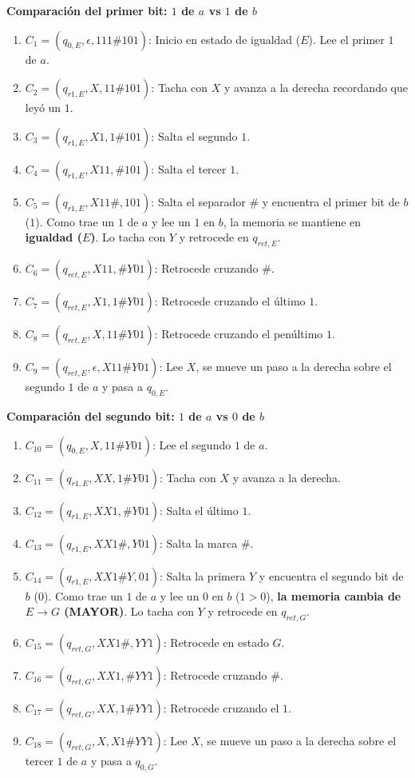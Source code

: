 \vspace{0.2cm}
\noindent\textbf{Comparación del primer bit: $1$ de $a$ vs $1$ de $b$}
\begin{enumerate}[label=\arabic*., leftmargin=*]
    \item $C_1 = (q_{0,E}, \epsilon, 111\#101)$: Inicio en estado de igualdad ($E$). Lee el primer $1$ de $a$.
    \item $C_2 = (q_{r1,E}, X, 11\#101)$: Tacha con $X$ y avanza a la derecha recordando que leyó un $1$.
    \item $C_3 = (q_{r1,E}, X1, 1\#101)$: Salta el segundo $1$.
    \item $C_4 = (q_{r1,E}, X11, \#101)$: Salta el tercer $1$.
    \item $C_5 = (q_{r1,E}, X11\#, 101)$: Salta el separador $\#$ y encuentra el primer bit de $b$ ($1$). Como trae un $1$ de $a$ y lee un $1$ en $b$, la memoria se mantiene en \textbf{igualdad ($E$)}. Lo tacha con $Y$ y retrocede en $q_{ret,E}$.
    \item $C_6 = (q_{ret,E}, X11, \#Y01)$: Retrocede cruzando $\#$.
    \item $C_7 = (q_{ret,E}, X1, 1\#Y01)$: Retrocede cruzando el último $1$.
    \item $C_8 = (q_{ret,E}, X, 11\#Y01)$: Retrocede cruzando el penúltimo $1$.
    \item $C_9 = (q_{ret,E}, \epsilon, X11\#Y01)$: Lee $X$, se mueve un paso a la derecha sobre el segundo $1$ de $a$ y pasa a $q_{0,E}$.
\end{enumerate}

\vspace{0.2cm}
\noindent\textbf{Comparación del segundo bit: $1$ de $a$ vs $0$ de $b$}
\begin{enumerate}[label=\arabic*., start=10, leftmargin=*]
    \item $C_{10} = (q_{0,E}, X, 11\#Y01)$: Lee el segundo $1$ de $a$.
    \item $C_{11} = (q_{r1,E}, XX, 1\#Y01)$: Tacha con $X$ y avanza a la derecha.
    \item $C_{12} = (q_{r1,E}, XX1, \#Y01)$: Salta el último $1$.
    \item $C_{13} = (q_{r1,E}, XX1\#, Y01)$: Salta la marca $\#$.
    \item $C_{14} = (q_{r1,E}, XX1\#Y, 01)$: Salta la primera $Y$ y encuentra el segundo bit de $b$ ($0$). Como trae un $1$ de $a$ y lee un $0$ en $b$ ($1 > 0$), \textbf{la memoria cambia de $E \to G$ (MAYOR)}. Lo tacha con $Y$ y retrocede en $q_{ret,G}$.
    \item $C_{15} = (q_{ret,G}, XX1\#, YY1)$: Retrocede en estado $G$.
    \item $C_{16} = (q_{ret,G}, XX1, \#YY1)$: Retrocede cruzando $\#$.
    \item $C_{17} = (q_{ret,G}, XX, 1\#YY1)$: Retrocede cruzando el $1$.
    \item $C_{18} = (q_{ret,G}, X, X1\#YY1)$: Lee $X$, se mueve un paso a la derecha sobre el tercer $1$ de $a$ y pasa a $q_{0,G}$.
\end{enumerate}

